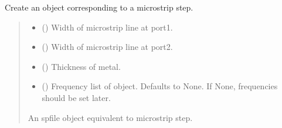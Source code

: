 \documentclass[letterpaper,10pt,english]{sphinxmanual}
\begin{document}
\begin{fulllineitems}
\begin{fulllineitems}
\label{\detokenize{touchstone:touchstone.spfile.microstripstep}}
\pysigstartsignatures
{}
\pysigstopsignatures
\sphinxAtStartPar
Create an  object corresponding to a microstrip step.
\begin{quote}\begin{description}
\begin{itemize}
\item {} 
\sphinxAtStartPar
{} () \textendash{} Width of microstrip line at port\sphinxhyphen{}1.

\item {} 
\sphinxAtStartPar
{} () \textendash{} Width of microstrip line at port\sphinxhyphen{}2.

\item {} 
\sphinxAtStartPar
{} () \textendash{} Thickness of metal.

\item {} 
\sphinxAtStartPar
{} (\sphinxstyleliteralemphasis{\sphinxupquote{, }}) \textendash{} Frequency list of object. Defaults to None. If None, frequencies should be set later.

\end{itemize}

\sphinxAtStartPar
An spfile object equivalent to microstrip step.

\sphinxAtStartPar
{\hyperref[\detokenize{touchstone:touchstone.spfile}]{}}

\end{description}\end{quote}

\end{fulllineitems}


\end{fulllineitems}
\end{document}
